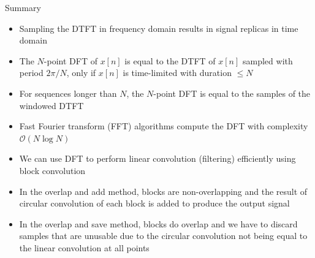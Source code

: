 \documentclass[10pt]{beamer}
\begin{document}
%
\begin{frame}{Summary}
	\begin{itemize}
		\item Sampling the DTFT in frequency domain results in signal replicas in time domain
		\item The $N$-point DFT of $x[n]$ is equal to the DTFT of $x[n]$ sampled with period $2\pi/N$, only if $x[n]$ is time-limited with duration $\leq N$
		\item For sequences longer than $N$, the $N$-point DFT is equal to the samples of the windowed DTFT
		\item Fast Fourier transform (FFT) algorithms compute the DFT with complexity $\mathcal{O}(N\log N)$
		\item We can use DFT to perform linear convolution (filtering) efficiently using block convolution
		\item In the overlap and add method, blocks are non-overlapping and the result of circular convolution of each block is added to produce the output signal
		\item In the overlap and save method, blocks do overlap and we have to discard samples that are unusable due to the circular convolution not being equal to the linear convolution at all points
	\end{itemize}
\end{frame}
\end{document}

